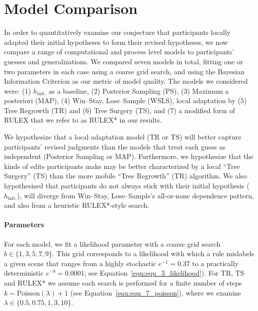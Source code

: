 \documentclass[doc,natbib,floatsintext]{apa7}
\newcommand{\hi}{h_{\mathrm{init.}}}
\begin{document}
\section{Model Comparison}

In order to quantitatively examine our conjecture that participants locally adapted their initial hypotheses to form their revised hypotheses, we now compare a range of computational and process level models to participants' guesses and generalizations. We compared seven models in total, fitting one or two parameters in each case using a coarse grid search, and using the Bayesian Information Criterion \citep[BIC,][]{schwarz1978estimating} as our metric of model quality. The models we considered were: (1) $\hi$ as a baseline, (2) Posterior Sampling (PS), (3) Maximum a posteriori (MAP), (4) Win--Stay, Lose--Sample (WSLS), local adaptation by (5) Tree Regrowth (TR) and (6) Tree Surgery (TS), and (7) a modified form of RULEX that we refer to as RULEX* in our results.

We hypothesize that a local adaptation model (TR or TS) will better capture participants' revised judgments than the models that treat each guess as independent (Posterior Sampling or MAP). Furthermore, we hypothesize that the kinds of edits participants make may be better characterized by a local ``Tree Surgery'' (TS) than the more mobile ``Tree Regrowth'' (TR) algorithm. We also hypothesized that participants do not always stick with their initial hypothesis ($\hi$), will diverge from Win--Stay, Lose--Sample's all-or-none dependence pattern, and also from a heuristic RULEX*-style search.

\paragraph{Parameters}
For each model, we fit a likelihood parameter with a coarse grid search $b\in \{1, 3, 5, 7, 9\}$. This grid corresponds to a likelihood with which a rule mislabels a given scene that ranges from a highly stochastic $e^{-1}=0.37$ to a practically deterministic $e^{-9} = 0.0001$; see Equation~\ref{equ:equ_3_likelihood}). For TR, TS and RULEX* we assume each search is performed for a finite number of steps $k \sim \mathrm{Poisson}(\lambda)+1$ (see Equation~\ref{equ:equ_7_poisson}), where we examine $\lambda \in \{0.5, 0.75, 1, 3, 10\}$.
\end{document}
